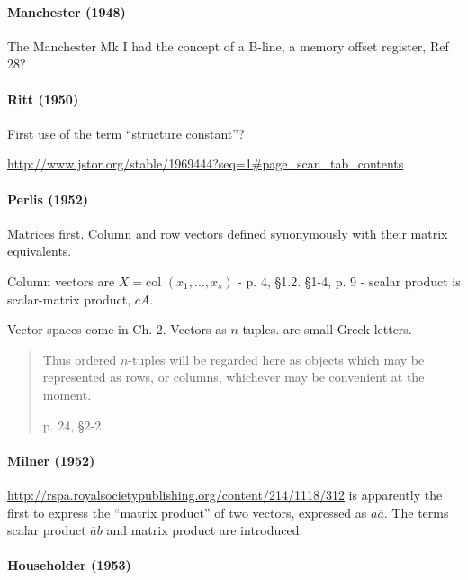 \paragraph{Manchester (1948)}

The Manchester Mk I had the concept of a B-line, a memory offset register, Ref 28?



\paragraph{Ritt (1950)~\cite{Ritt1950}}

First use of the term ``structure constant''?

\url{http://www.jstor.org/stable/1969444?seq=1#page_scan_tab_contents}


\paragraph{Perlis (1952)~\cite{Perlis1952}}

Matrices first. Column and row vectors defined synonymously with their matrix equivalents.

Column vectors are $X = \textrm{col }(x_1, \dots, x_s)$ - p. 4, \S 1.2.
\S 1-4, p. 9 - scalar product is scalar-matrix product, $c A$.

Vector spaces come in Ch. 2. Vectors as $n$-tuples. are small Greek letters.

\begin{quote}
Thus ordered $n$-tuples will be regarded here as objects which may be
represented as rows, or columns, whichever may be convenient at the moment.

p. 24, \S2-2.
\end{quote}



\paragraph{Milner (1952)}

\url{http://rspa.royalsocietypublishing.org/content/214/1118/312}
is apparently the first to express the ``matrix product'' of two vectors,
expressed as $a \overline{a}$.  The terms scalar product $\overline{a} b$ and
matrix product are introduced.



\paragraph{Householder (1953)~\cite{Householder1953}}

